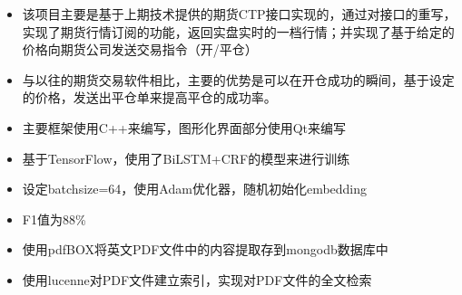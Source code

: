 \begin{itemize}
\setlength{\baselineskip}{14pt}
\justifying
\item 该项目主要是基于上期技术提供的期货CTP接口实现的，通过对接口的重写，实现了期货行情订阅的功能，返回实盘实时的一档行情；并实现了基于给定的价格向期货公司发送交易指令（开/平仓）
\item 与以往的期货交易软件相比，主要的优势是可以在开仓成功的瞬间，基于设定的价格，发送出平仓单来提高平仓的成功率。
\item 主要框架使用C++来编写，图形化界面部分使用Qt来编写
\end{itemize}
\smallskip

\divider

\begin{itemize}
\setlength{\baselineskip}{14pt}
\justifying
\item 基于TensorFlow，使用了BiLSTM+CRF的模型来进行训练
\item 设定batchsize=64，使用Adam优化器，随机初始化embedding
\item F1值为88\%
\end{itemize}
\smallskip

\divider

\begin{itemize}
\setlength{\baselineskip}{14pt}
\justifying
\item 使用pdfBOX将英文PDF文件中的内容提取存到mongodb数据库中
\item 使用lucenne对PDF文件建立索引，实现对PDF文件的全文检索
\end{itemize}
\smallskip


\par
\smallskip


\par
\smallskip

